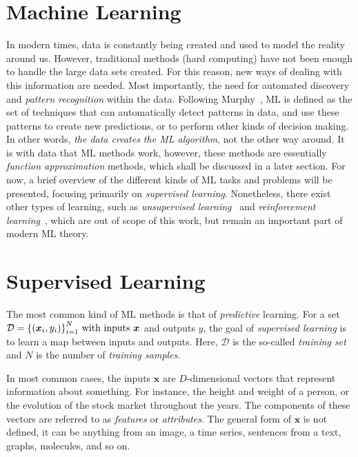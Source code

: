 \section{Machine Learning}
In modern times, data is constantly being created and used to model the reality around us.
However, traditional methods (hard computing) have not been enough to handle the large
data sets created. For this reason, new ways of dealing with this information are needed. 
Most importantly, the need for automated discovery and \emph{pattern recognition} within the
data. Following Murphy~\cite{murphyMachineLearningProbabilistic2012}, ML 
is defined as the set of techniques that can automatically detect patterns in data, and use 
these patterns to create new predictions, or to perform other kinds of decision making.
In other words, \emph{the data creates the ML algorithm}, not the other way around.
It is with data that ML methods work, however, these methods are essentially
\emph{function approximation} methods, which shall be discussed in a later section.
For now, a brief overview of the different kinds of ML tasks and problems will be presented,
focusing primarily on \emph{supervised learning}. Nonetheless, there exist other types
of learning, such as \emph{unsupervised learning}~\cite{goodfellowDeepLearning2016,hastieElementsStatisticalLearning2009} and \emph{reinforcement learning}~\cite{suttonReinforcementLearningSecond2018,kaelblingReinforcementLearningSurvey1996},
which are out of scope of this work, but remain an important part of modern ML theory.

\section{Supervised Learning}
The most common kind of ML methods is that of \emph{predictive} learning. For a set 
\(\mathcal{D}={ \{(\bm{x}_{i}, y_i)\} }_{i=1}^{N}$ with inputs $\bm{x}\)
and outputs $y$, the goal of \emph{supervised learning} is to learn a map between
inputs and outputs. Here, $\mathcal{D}$ is the so-called \emph{training set} and $N$
is the number of \emph{training samples}.

In most common cases, the inputs $\bm{x}$ are $D$-dimensional vectors that
represent information about something. For instance, the height and weight of a
person, or the evolution of the stock market throughout the years. 
The components of these vectors are referred to as \emph{features} or \emph{attributes}.
The general form of $\bm{x}$ is not defined, it can be anything from an image, a time 
series, sentences from a text, graphs, molecules, and so on.

